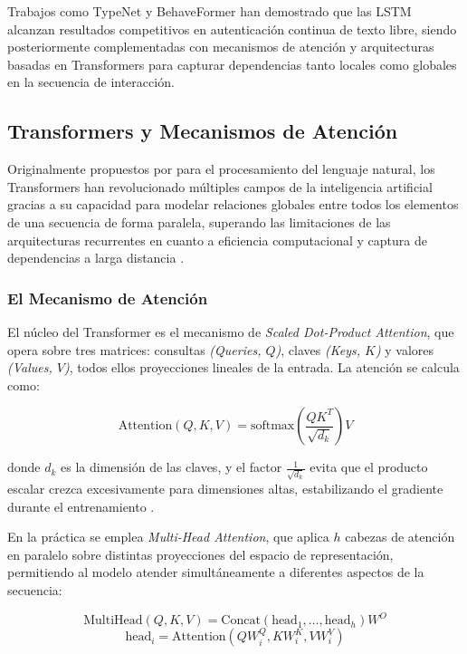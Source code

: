 Trabajos como TypeNet \cite{acien2022keystroke} y BehaveFormer 
\cite{senerath2023behaveformer} han demostrado que las LSTM alcanzan 
resultados competitivos en autenticación continua de texto libre, siendo 
posteriormente complementadas con mecanismos de atención y arquitecturas 
basadas en Transformers para capturar dependencias tanto locales como globales 
en la secuencia de interacción.

\subsection{Transformers y Mecanismos de Atención}

Originalmente propuestos por \citeauthor{vaswani2017attention} para el 
procesamiento del lenguaje natural, los Transformers han revolucionado 
múltiples campos de la inteligencia artificial gracias a su capacidad para 
modelar relaciones globales entre todos los elementos de una secuencia de 
forma paralela, superando las limitaciones de las arquitecturas recurrentes 
en cuanto a eficiencia computacional y captura de dependencias a larga 
distancia \cite{vaswani2017attention}.

\subsubsection{El Mecanismo de Atención}

El núcleo del Transformer es el mecanismo de \textit{Scaled Dot-Product 
Attention}, que opera sobre tres matrices: consultas \textit{(Queries, $Q$)}, 
claves \textit{(Keys, $K$)} y valores \textit{(Values, $V$)}, todos ellos 
proyecciones lineales de la entrada. La atención se calcula como:

\begin{equation}
    \text{Attention}(Q, K, V) = \text{softmax}\left(\frac{QK^T}{\sqrt{d_k}}\right)V
\end{equation}

donde $d_k$ es la dimensión de las claves, y el factor $\frac{1}{\sqrt{d_k}}$ 
evita que el producto escalar crezca excesivamente para dimensiones altas, 
estabilizando el gradiente durante el entrenamiento \cite{vaswani2017attention}.

En la práctica se emplea \textit{Multi-Head Attention}, que aplica $h$ 
cabezas de atención en paralelo sobre distintas proyecciones del espacio de 
representación, permitiendo al modelo atender simultáneamente a diferentes 
aspectos de la secuencia:

\begin{equation}
    \text{MultiHead}(Q, K, V) = \text{Concat}(\text{head}_1, \ldots, 
    \text{head}_h)W^O
\end{equation}
\begin{equation}
    \text{head}_i = \text{Attention}(QW_i^Q, KW_i^K, VW_i^V)
\end{equation}

